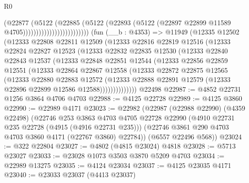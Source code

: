 \begin{lexlean}{R0}
\begin{coremodule}
                                        (@22877
                                          (@5122
                                            (@22885
                                              (@5122
                                                (@22893
                                                  (@5122
                                                    (@22897
                                                      @22899
                                                      @11589
                                                      @4705)))))))))))))))))))))))))
    (fun (__b : @4353) =>
    @11949
      (@12335
        @12502
        (@12333
          @22808
          @22811
          @12509
          (@12333
            @22816
            @22819
            @12516
            (@12333
              @22824
              @22827
              @12523
              (@12333
                @22832
                @22835
                @12530
                (@12333
                  @22840
                  @22843
                  @12537
                  (@12333
                    @22848
                    @22851
                    @12544
                    (@12333
                      @22856
                      @22859
                      @12551
                      (@12333
                        @22864
                        @22867
                        @12558
                        (@12333
                          @22872
                          @22875
                          @12565
                          (@12333
                            @22880
                            @22883
                            @12572
                            (@12333
                              @22888
                              @22891
                              @12579
                              (@12333 @22896 @22899 @12586 @12588))))))))))))))
    @22498
@22987 := @4852 @22731 @1256 @3864 @4706 @4703
@22988 := @4125 @22728
@22989 := @4125 @3860
@22990 := @22989 @4171
@23023 := @22982
    (@22987
      (@22988 @22990)
      (@4359 @22498)
      (@22746
        @253
        @3863
        @4703
        @4705
        @22728
        @22990
        (@4910 @22731 @235 @22728 (@4915 (@4916 @22731 @235)))
        (@22746 @3861 @290 @4703 @4703 @3860 @4171 (@22767 @3860) @22784))
      (@6557 @22496 @568))
@23024 := @322 @22804
@23027 := @4802 (@4815 @23024) @4818
@23028 := @5713 @23027
@23033 := @23028 @1073 @3503 @3870 @5209 @4703
@23034 := @22989 @13275
@23035 := @4124 @23034
@23037 := @4125 @23035 @4171
@23040 := @23033 @23037 (@4413 @23037)

\end{coremodule}
\end{lexlean}
